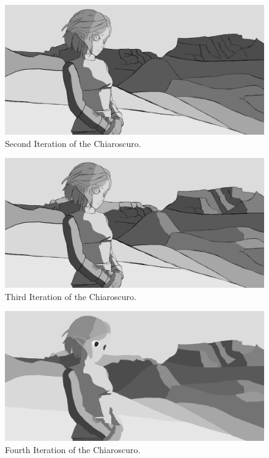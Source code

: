 \documentclass{cup-pan}
\begin{document}
        \begin{figure}[H]
            \includegraphics[width=\textwidth]{Fanart3/2_Claroscuro/II_Iteracion.png}
            \caption{Second Iteration of the Chiaroscuro.}
        \end{figure}

        \begin{figure}[H]
            \includegraphics[width=\textwidth]{Fanart3/2_Claroscuro/III_Iteracion.png}
            \caption{Third Iteration of the Chiaroscuro.}
        \end{figure}

        \begin{figure}[H]
            \includegraphics[width=\textwidth]{Fanart3/2_Claroscuro/IIII_Claroscuro.png}
            \caption{Fourth Iteration of the Chiaroscuro.}
        \end{figure}
\end{document}
